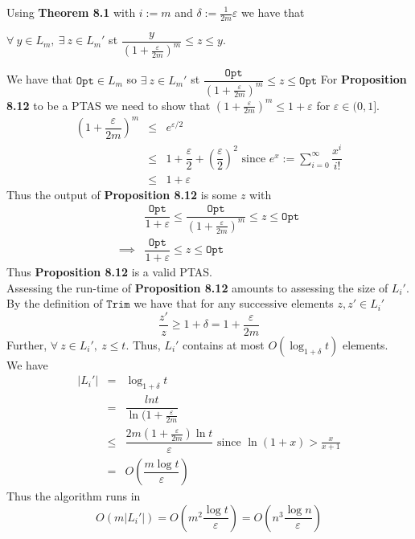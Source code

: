 \documentclass[11pt,a4paper]{article}
\begin{document}
Using \textbf{Theorem 8.1} with $i:=m$ and $\delta:=\frac{1}{2m}\varepsilon$ we have that
\begin{center}
$\forall\ y\in L_m,\ \exists\ z\in L_m'$ st $\dfrac{y}{(1+\frac\varepsilon{2m})^m}\leq z\leq y$.
\end{center}
We have that $\mathtt{Opt}\in L_m$ so $\exists\ z\in L_m'$ st $\dfrac{\mathtt{Opt}}{(1+\frac\varepsilon{2m})^m}\leq z\leq\mathtt{Opt}$
For \textbf{Proposition 8.12} to be a PTAS we need to show that $(1+\frac\varepsilon{2m})^m\leq1+\varepsilon$ for $\varepsilon\in(0,1]$.
\[\begin{array}{rcl}
\left(1+\dfrac\varepsilon{2m}\right)^m&\leq&e^{\varepsilon/2}\\
&\leq&1+\dfrac\varepsilon2+\left(\dfrac\varepsilon2\right)^2\text{ since }e^x:=\sum_{i=0}^\infty\dfrac{x^i}{i!}\\
&\leq&1+\varepsilon
\end{array}\]
Thus the output of \textbf{Proposition 8.12} is some $z$ with
\[\begin{array}{rl}
&\dfrac{\mathtt{Opt}}{1+\varepsilon}\leq\dfrac{\mathtt{Opt}}{(1+\frac\varepsilon{2m})^m}\leq z\leq\mathtt{Opt}\\
\implies&\dfrac{\mathtt{Opt}}{1+\varepsilon}\leq z\leq\mathtt{Opt}
\end{array}\]
Thus \textbf{Proposition 8.12} is a valid PTAS.\\

Assessing the run-time of \textbf{Proposition 8.12} amounts to assessing the size of $L_i'$.\\
By the definition of $\mathtt{Trim}$ we have that for any successive elements $z,z'\in L_i'$
$$\dfrac{z'}z\geq1+\delta=1+\frac\varepsilon{2m}$$
Further, $\forall\ z\in L_i',\ z\leq t$.
Thus, $L_i'$ contains at most $O(\log_{1+\delta}t)$ elements.\\
We have
\[\begin{array}{rcl}
|L_i'|&=&\log_{1+\delta}t\\
&=&\dfrac{ln t}{\ln(1+\frac\varepsilon{2m}}\\
&\leq&\dfrac{2m(1+\frac\varepsilon{2m})\ln t}{\varepsilon}\text{ since }\ln(1+x)>\frac{x}{x+1}\\
&=&O\left(\dfrac{m\log t}\varepsilon\right)
\end{array}\]
Thus the algorithm runs in
$$O(m|L_i'|)=O\left(m^2\frac{\log t}\varepsilon\right)=O\left(n^3\frac{\log n}\varepsilon\right)$$
\end{document}

